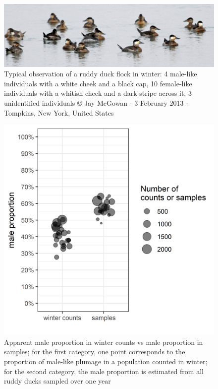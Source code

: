 \documentclass[
  english,
]{article}
\begin{document}
\begin{figure}[H]

{\centering \includegraphics[width=1\linewidth]{../Output/flock} 

}

\caption{Typical observation of a ruddy duck flock in winter: 4 male-like individuals with a white cheek and a black cap, 10 female-like individuals with a whitish cheek and a dark stripe across it, 3 unidentified individuals © Jay McGowan - 3 February 2013 - Tompkins, New York, United States}\label{fig:flock}
\end{figure}

\begin{figure}[H]

{\centering \includegraphics[width=1\linewidth]{../Output/plot_1_saved} 

}

\caption{Apparent male proportion in winter counts vs male proportion in samples; for the first category, one point corresponds to the proportion of male-like plumage in a population counted in winter; for the second category, the male proportion is estimated from all ruddy ducks sampled over one year}\label{fig:pmal}
\end{figure}
\end{document}
